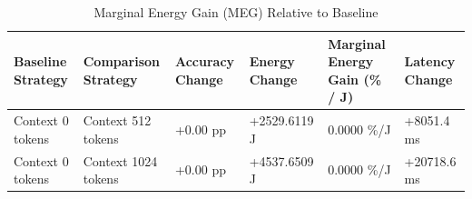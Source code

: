 \begin{table}
\caption{Marginal Energy Gain (MEG) Relative to Baseline}
\label{tab:marginal_energy_gain}
\begin{tabular}{llllll}
\toprule
Baseline Strategy & Comparison Strategy & Accuracy Change & Energy Change & Marginal Energy Gain (\% / J) & Latency Change \\
\midrule
Context 0 tokens & Context 512 tokens & +0.00 pp & +2529.6119 J & 0.0000 \%/J & +8051.4 ms \\
Context 0 tokens & Context 1024 tokens & +0.00 pp & +4537.6509 J & 0.0000 \%/J & +20718.6 ms \\
\bottomrule
\end{tabular}
\end{table}
